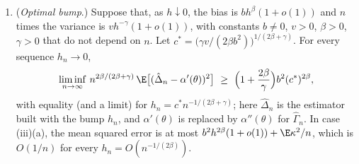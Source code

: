 \begin{proposition}
\begin{enumerate}[label=(\roman*)]
\begin{enumerate}[label=(\alph*)]
        $h<\delta$.
      \item If $\E\big[(Y(\theta_1)-Y(\theta_2))^2\big]\le c|\theta_1-\theta_2|$ for
        $\theta_1,\theta_2$ near $\theta$ (a payoff with a jump, \cref{exa:gr-digital}), then
        $\Var\hat\Delta^F_n\le c/(nh)$ and $\Var\hat\Delta^C_n\le c/(2nh)$.
      \item If $|Y(\theta+h)-2Y(\theta)+Y(\theta-h)|\le h\kappa\1_{A_h}$ for a random $\kappa\ge0$
        and events $A_h$ with $\E[\kappa^2\1_{A_h}]\le ch$ (a payoff with a kink,
        \cref{rem:gr-kernel}), then $\Var\hat\Gamma_n\le c/(nh)$.
    \end{enumerate}
  \item (\emph{Optimal bump}.) Suppose that, as $h\downarrow0$, the bias is
    $bh^\beta(1+o(1))$ and $n$ times the variance is $vh^{-\gamma}(1+o(1))$, with constants
    $b\ne0$, $v>0$, $\beta>0$, $\gamma>0$ that do not depend on $n$. Let
    $c^*=\big(\gamma v/(2\beta b^2)\big)^{1/(2\beta+\gamma)}$. For every sequence
    $h_n\to0$,
    \[
      \liminf_{n\to\infty}\,n^{2\beta/(2\beta+\gamma)}\,\E\big[(\hat\Delta_n-\alpha'(\theta))^2\big]
      \ \ge\ \Big(1+\frac{2\beta}{\gamma}\Big)b^2(c^*)^{2\beta},
    \]
    with equality (and a limit) for $h_n=c^*n^{-1/(2\beta+\gamma)}$; here $\hat\Delta_n$ is
    the estimator built with the bump $h_n$, and $\alpha'(\theta)$ is replaced by
    $\alpha''(\theta)$ for $\hat\Gamma_n$. In case (iii)(a), the mean squared error is at
    most $b^2h^{2\beta}(1+o(1))+\E\kappa^2/n$, which is $O(1/n)$ for every $h_n=O(n^{-1/(2\beta)})$.
\end{enumerate}
\end{proposition}

